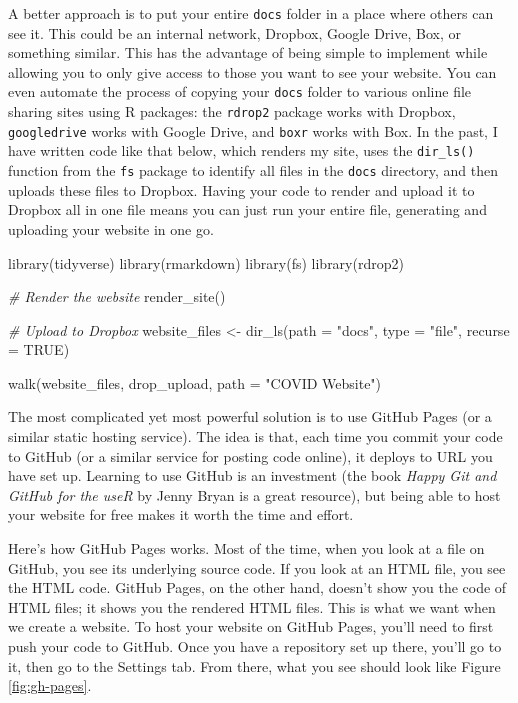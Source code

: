 \documentclass[
]{book}
\newenvironment{Shaded}{\begin{snugshade}}{\end{snugshade}}
\newcommand{\AttributeTok}[1]{\textcolor[rgb]{0.77,0.63,0.00}{#1}}
\newcommand{\CommentTok}[1]{\textcolor[rgb]{0.56,0.35,0.01}{\textit{#1}}}
\newcommand{\ConstantTok}[1]{\textcolor[rgb]{0.00,0.00,0.00}{#1}}
\newcommand{\FunctionTok}[1]{\textcolor[rgb]{0.00,0.00,0.00}{#1}}
\newcommand{\NormalTok}[1]{#1}
\newcommand{\OtherTok}[1]{\textcolor[rgb]{0.56,0.35,0.01}{#1}}
\newcommand{\StringTok}[1]{\textcolor[rgb]{0.31,0.60,0.02}{#1}}
\begin{document}
A better approach is to put your entire \texttt{docs} folder in a place where others can see it. This could be an internal network, Dropbox, Google Drive, Box, or something similar. This has the advantage of being simple to implement while allowing you to only give access to those you want to see your website. You can even automate the process of copying your \texttt{docs} folder to various online file sharing sites using R packages: the \texttt{rdrop2} package works with Dropbox, \texttt{googledrive} works with Google Drive, and \texttt{boxr} works with Box. In the past, I have written code like that below, which renders my site, uses the \texttt{dir\_ls()} function from the \texttt{fs} package to identify all files in the \texttt{docs} directory, and then uploads these files to Dropbox. Having your code to render and upload it to Dropbox all in one file means you can just run your entire file, generating and uploading your website in one go.

\begin{Shaded}
\begin{Highlighting}[]
\FunctionTok{library}\NormalTok{(tidyverse)}
\FunctionTok{library}\NormalTok{(rmarkdown)}
\FunctionTok{library}\NormalTok{(fs)}
\FunctionTok{library}\NormalTok{(rdrop2)}

\CommentTok{\# Render the website}
\FunctionTok{render\_site}\NormalTok{()}

\CommentTok{\# Upload to Dropbox}
\NormalTok{website\_files }\OtherTok{\textless{}{-}} \FunctionTok{dir\_ls}\NormalTok{(}\AttributeTok{path =} \StringTok{"docs"}\NormalTok{,}
                        \AttributeTok{type =} \StringTok{"file"}\NormalTok{,}
                        \AttributeTok{recurse =} \ConstantTok{TRUE}\NormalTok{)}

\FunctionTok{walk}\NormalTok{(website\_files, drop\_upload, }\AttributeTok{path =} \StringTok{"COVID Website"}\NormalTok{)}
\end{Highlighting}
\end{Shaded}

The most complicated yet most powerful solution is to use GitHub Pages (or a similar static hosting service). The idea is that, each time you commit your code to GitHub (or a similar service for posting code online), it deploys to URL you have set up. Learning to use GitHub is an investment (the book \emph{Happy Git and GitHub for the useR} by Jenny Bryan is a great resource), but being able to host your website for free makes it worth the time and effort.

Here's how GitHub Pages works. Most of the time, when you look at a file on GitHub, you see its underlying source code. If you look at an HTML file, you see the HTML code. GitHub Pages, on the other hand, doesn't show you the code of HTML files; it shows you the rendered HTML files. This is what we want when we create a website. To host your website on GitHub Pages, you'll need to first push your code to GitHub. Once you have a repository set up there, you'll go to it, then go to the Settings tab. From there, what you see should look like Figure \ref{fig:gh-pages}.
\end{document}
